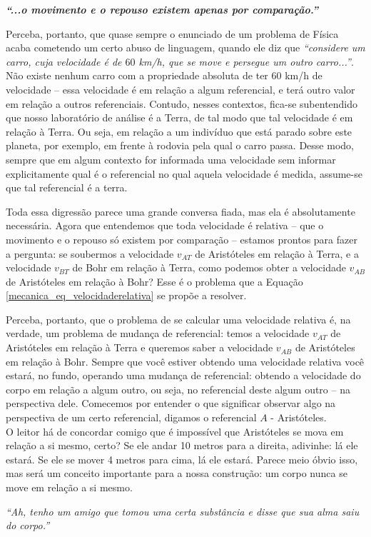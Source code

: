 \begin{center}
   \textit{\textbf{``...o movimento e o repouso existem apenas por comparação.''}} 
\end{center}

Perceba, portanto, que quase sempre o enunciado de um problema de Física acaba cometendo um certo abuso de linguagem, quando ele diz que \textit{``considere um carro, cuja velocidade é de $60$ km/h, que se move e persegue um outro carro...''}. Não existe nenhum carro com a propriedade absoluta de ter $60$ km/h de velocidade -- essa velocidade é em relação a algum referencial, e terá outro valor em relação a outros referenciais. Contudo, nesses contextos, fica-se subentendido que nosso laboratório de análise é a Terra, de tal modo que tal velocidade é em relação à Terra. Ou seja, em relação a um indivíduo que está parado sobre este planeta, por exemplo, em frente à rodovia pela qual o carro passa. Desse modo, sempre que em algum contexto for informada uma velocidade sem informar explicitamente qual é o referencial no qual aquela velocidade é medida, assume-se que tal referencial é a terra.

Toda essa digressão parece uma grande conversa fiada, mas ela é absolutamente necessária. Agora que entendemos que toda velocidade é relativa -- que o movimento e o repouso só existem por comparação -- estamos prontos para fazer a pergunta: se soubermos a velocidade $v_{AT}$ de Aristóteles em relação à Terra, e a velocidade $v_{BT}$ de Bohr em relação à Terra, como podemos obter a velocidade $v_{AB}$ de Aristóteles em relação à Bohr? Esse é o problema que a Equação \eqref{mecanica_eq_velocidaderelativa} se propõe a resolver.

Perceba, portanto, que o problema de se calcular uma velocidade relativa é, na verdade, um problema de mudança de referencial: temos a velocidade $v_{AT}$ de Aristóteles em relação à Terra e queremos saber a velocidade $v_{AB}$ de Aristóteles em relação à Bohr. Sempre que você estiver obtendo uma velocidade relativa você estará, no fundo, operando uma mudança de referencial: obtendo a velocidade do corpo em relação a algum outro, ou seja, no referencial deste algum outro -- na perspectiva dele. Comecemos por entender o que significar observar algo na perspectiva de um certo referencial, digamos o referencial $A$ - Aristóteles. \\

O leitor há de concordar comigo que é impossível que Aristóteles se mova em relação a si mesmo, certo? Se ele andar 10 metros para a direita, adivinhe: lá ele estará. Se ele se mover 4 metros para cima, lá ele estará. Parece meio óbvio isso, mas será um conceito importante para a nossa construção: um corpo nunca se move em relação a si mesmo. 
\begin{center}
    \textit{``Ah, tenho um amigo que tomou uma certa substância e disse que sua alma saiu do corpo.''} 
\end{center}

